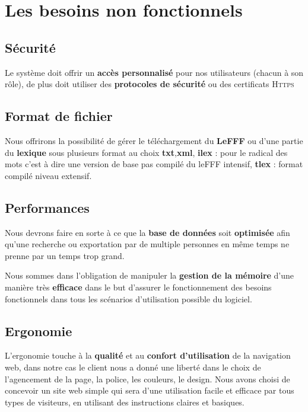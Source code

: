 {\newpage
\section{Les besoins non fonctionnels}

\subsection{Sécurité}
{Le système doit offrir un \textbf{accès personnalisé} pour nos utilisateurs (chacun à son rôle), de plus doit utiliser des \textbf{protocoles de sécurité} ou des certificats \textsc{Https} }

\subsection{Format de fichier}
Nous offrirons la possibilité de gérer le téléchargement du \textbf{LeFFF} ou d'une partie du \textbf{lexique} sous plusieurs format au choix  \textbf{txt},\textbf{xml}, \textbf{ilex} : pour le radical des mots c'est à dire une version de base pas compilé du leFFF intensif, \textbf{tlex} : format compilé niveau extensif.

\subsection{Performances}

{Nous devrons faire en sorte à ce que la \textbf{base de données} soit \textbf{optimisée} afin qu'une recherche ou exportation par de multiple personnes en même temps ne prenne par un temps trop grand.\par}
Nous sommes dans l'obligation de manipuler la \textbf{gestion de la mémoire} d'une manière très \textbf{efficace} dans le but d'assurer le fonctionnement des besoins fonctionnels dans tous les scénarios d'utilisation possible du logiciel. 

\subsection{Ergonomie}
L’ergonomie touche à la \textbf{qualité} et au \textbf{confort d’utilisation} de la navigation web, dans notre cas le client nous a donné une liberté dans le choix de l'agencement de la page, la police, les couleurs, le design. Nous avons choisi de concevoir un site web simple qui sera d'une utilisation facile et efficace par tous types de visiteurs, en utilisant des instructions claires et basiques.

}
